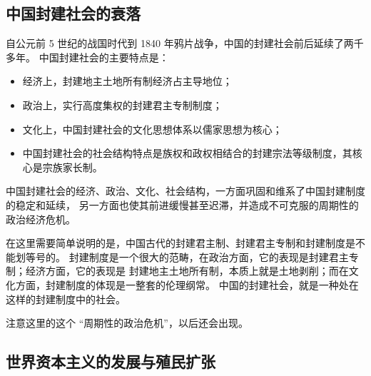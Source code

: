 \documentclass[10pt, UTF8]{ctexbook} %
\begin{document}
\subsection{中国封建社会的衰落}


自公元前 5 世纪的战国时代到 1840 年鸦片战争，中国的封建社会前后延续了两千多年。
中国封建社会的主要特点是：
\begin{itemize}[itemsep=0pt]
    \item 经济上，封建地主土地所有制经济占主导地位；
    \item 政治上，实行高度集权的封建君主专制制度；
    \item 文化上，中国封建社会的文化思想体系以儒家思想为核心；
    \item 中国封建社会的社会结构特点是族权和政权相结合的封建宗法等级制度，其核心是宗族家长制。
\end{itemize}
中国封建社会的经济、政治、文化、社会结构，一方面巩固和维系了中国封建制度的稳定和延续，
另一方面也使其前进缓慢甚至迟滞，并造成不可克服的周期性的政治经济危机。
\begin{remark}
    在这里需要简单说明的是，中国古代的封建君主制、封建君主专制和封建制度是不能划等号的。
    封建制度是一个很大的范畴，在政治方面，它的表现是封建君主专制；经济方面，它的表现是
    封建地主土地所有制，本质上就是土地剥削；而在文化方面，封建制度的体现是一整套的伦理纲常。
    中国的封建社会，就是一种处在这样的封建制度中的社会。
\end{remark}
\begin{remark}
    注意这里的这个 “周期性的政治危机”，以后还会出现。
\end{remark}

\subsection{世界资本主义的发展与殖民扩张}
\end{document}
